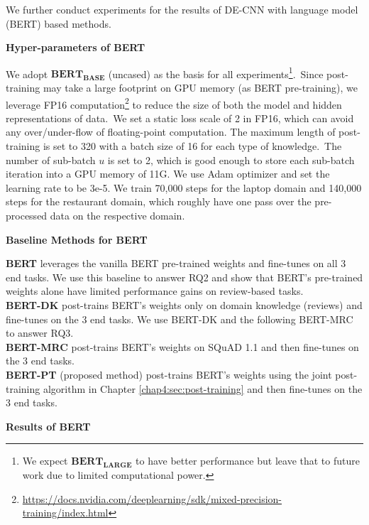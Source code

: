 We further conduct experiments for the results of DE-CNN with language model (BERT) based methods.

\textbf{Hyper-parameters of BERT}
\label{chap6:sec:hyp}

We adopt $\textbf{BERT}_\textbf{BASE}$ (uncased) as the basis for all experiments\footnote{We expect $\textbf{BERT}_\textbf{LARGE}$ to have better performance but leave that to future work due to limited computational power.}.~Since post-training may take a large footprint on GPU memory (as BERT pre-training), we leverage FP16 computation\footnote{\url{https://docs.nvidia.com/deeplearning/sdk/mixed-precision-training/index.html}} to reduce the size of both the model and hidden representations of data.~We set a static loss scale of 2 in FP16, which can avoid any over/under-flow of floating-point computation.
The maximum length of post-training is set to 320 with a batch size of 16 for each type of knowledge.~The number of sub-batch $u$ is set to 2, which is good enough to store each sub-batch iteration into a GPU memory of 11G. We use Adam optimizer and set the learning rate to be 3e-5.
We train 70,000 steps for the laptop domain and 140,000 steps for the restaurant domain, which roughly have one pass over the pre-processed data on the respective domain.

\textbf{Baseline Methods for BERT}

\textbf{BERT} leverages the vanilla BERT pre-trained weights and fine-tunes on all 3 end tasks. We use this baseline to answer RQ2 and show that BERT's pre-trained weights alone have limited performance gains on review-based tasks.\\
\textbf{BERT-DK} post-trains BERT's weights only on domain knowledge (reviews) and fine-tunes on the 3 end tasks. We use BERT-DK and the following BERT-MRC to answer RQ3.\\
\textbf{BERT-MRC} post-trains BERT's weights on SQuAD 1.1 and then fine-tunes on the 3 end tasks.\\
\textbf{BERT-PT} (proposed method) post-trains BERT's weights using the joint post-training algorithm in Chapter \ref{chap4:sec:post-training} and then fine-tunes on the 3 end tasks.

\textbf{Results of BERT}

